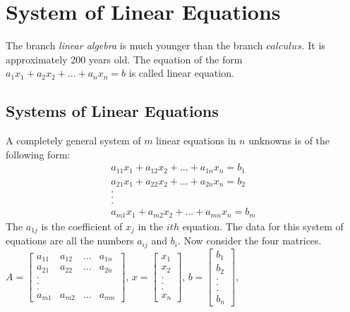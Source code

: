 \documentclass[math101_lecturenotes_ku.tex]{subfiles}
\begin{document}
\chapter{System of Linear Equations}
The branch \textit{linear algebra} is much younger than the branch $calculus$. It is approximately 200 years old. The equation of the form $a_1x_1+a_2x_2+...+a_nx_n=b$ is called linear equation.

\section{Systems of Linear Equations}
A completely general system of $m$ linear equations in $n$ unknowns is of the following form:
\begin{gather*}
    a_{11}x_1+a_{12}x_2+...+a_{1n}x_n=b_1 \\
    a_{21}x_1+a_{22}x_2+...+a_{2n}x_n=b_2 \\
    .\\
    .\\
    .\\
    a_{m1}x_1+a_{m2}x_2+...+a_{mn}x_n=b_m
\end{gather*}
The $a_{1j}$ is the coefficient of $x_j$ in the $ith$ equation. The data for this system of equations are all the numbers $a_{ij}$ and $b_i$. Now consider the four matrices. \\[3mm]
$\displaystyle
A= \begin{bmatrix}
    a_{11} & a_{12} & ... & a_{1n}\\
    a_{21} & a_{22} & ... & a_{2n}\\
    .\\
    .\\
    .\\
    a_{m1} & a_{m2} & ... & a_{mn}
\end{bmatrix}$,
$\displaystyle
x= \begin{bmatrix}
    x_1 \\
    x_2 \\
    .\\
    .\\
    .\\
    x_n
\end{bmatrix}$,
$\displaystyle
b=\begin{bmatrix}
    b_1 \\
    b_2 \\
    .\\
    .\\
    .\\
    b_n
\end{bmatrix}$, \hspace{10mm}
\end{document}
